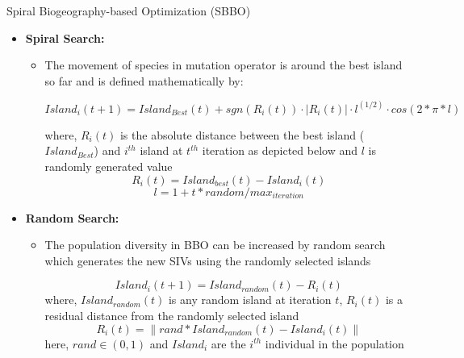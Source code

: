 \documentclass [9pt,times] {beamer}
\begin{document}
\begin{frame}{Spiral Biogeography-based Optimization (SBBO)}

\begin{itemize}
\item  {\bf Spiral Search:}
	\begin{itemize}
\fontsize{7pt}{9pt}\selectfont
		\item The movement of species in mutation operator is around the best island so far and is defined mathematically by:
		
\begin{equation*}\label{eq:S}
 Island_i(t+1)=Island_{Best}(t) + sgn(R_i(t))\cdot|R_i(t)|\cdot l ^{(1/2)}\cdot cos(2*\pi*l) 
\end{equation*}

where, $R_i(t)$ is the absolute distance between the best island ($Island_{Best}$) and $i^{th}$ island at $t^{th}$ iteration as depicted below  and $l$ is randomly generated value 
\begin{equation*}\label{eq:D}
R_i(t)=  Island_{best} (t)- Island_{i}(t)
\end{equation*}
\begin{equation*}\label{eq:D11}
l=  1+ t*random/max_{iteration}
\end{equation*}

	\end{itemize}
	
\item {\bf Random Search:}

\begin{itemize}
\fontsize{7pt}{9pt}\selectfont
\item The population diversity in BBO can be increased by random search which generates the new SIVs using the randomly selected islands

\begin{equation*}\label{eq:final2} 
Island_i(t+1)= Island_{random}(t)- R_i(t)
\end{equation*}
where, $Island_{random}(t)$ is any random island at iteration $t$, $R_i(t)$ is a residual  distance from the randomly selected island 
\begin{equation*}\label{eq:D1}
R_i(t)= \| rand * Island_{random} (t)- Island_{i}(t)\|
\end{equation*}
here, $rand \in (0, 1)$ and $Island_i$ are the $i^{th}$ individual in the population
\end{itemize}
\end{itemize}
\end{frame}
\end{document}
